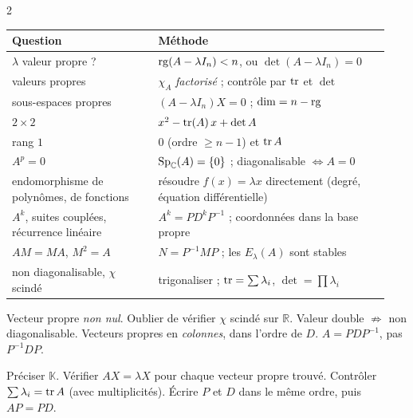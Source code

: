 \documentclass[a4paper,10pt]{article}
\newcommand{\K}{\mathbb{K}}\newcommand{\R}{\mathbb{R}}\newcommand{\C}{\mathbb{C}}\newcommand{\Z}{\mathbb{Z}}
\newcommand{\sous}[1]{\par\needspace{6\baselineskip}\vspace{0.25em}\noindent{\sffamily\bfseries\small\color{BleuMoyen}#1}\par\nobreak}
\begin{document}
\begin{multicols}{2}
\sous{Je vois\dots\ je fais\dots}
{\small\renewcommand{\arraystretch}{1.16}
\begin{tabular}{@{}>{\raggedright\arraybackslash}p{0.36\linewidth}>{\raggedright\arraybackslash}p{0.58\linewidth}@{}}
\toprule
\textsf{\scriptsize Question} & \textsf{\scriptsize Méthode}\\\midrule
$\lambda$ valeur propre ? & $\operatorname{rg}(A-\lambda I_n)<n$, ou $\det(A-\lambda I_n)=0$\\
valeurs propres & $\chi_A$ \emph{factorisé} ; contrôle par $\operatorname{tr}$ et $\det$\\
sous-espaces propres & $(A-\lambda I_n)X=0$ ; $\dim=n-\operatorname{rg}$\\
$2\times2$ & $x^2-\operatorname{tr}(A)\,x+\det A$\\
rang $1$ & $0$ (ordre $\geq n-1$) et $\operatorname{tr} A$\\
$A^p=0$ & $\Sp_\C(A)=\{0\}$ ; diagonalisable $\iff A=0$\\
endomorphisme de polynômes, de fonctions & résoudre $f(x)=\lambda x$ directement (degré, équation différentielle)\\
$A^k$, suites couplées, récurrence linéaire & $A^k=PD^kP^{-1}$ ; coordonnées dans la base propre\\
$AM=MA$, $M^2=A$ & $N=P^{-1}MP$ ; les $E_\lambda(A)$ sont stables\\
non diagonalisable, $\chi$ scindé & trigonaliser ; $\operatorname{tr}=\sum\lambda_i$, $\det=\prod\lambda_i$\\
\bottomrule
\end{tabular}}

\begin{PIEGE}
Vecteur propre \emph{non nul}. Oublier de vérifier $\chi$ scindé sur $\R$. Valeur double $\not\Rightarrow$ non diagonalisable.
Vecteurs propres en \emph{colonnes}, dans l'ordre de $D$. $A=PDP^{-1}$, pas $P^{-1}DP$.
\end{PIEGE}

\begin{REFL}
Préciser $\K$. Vérifier $AX=\lambda X$ pour chaque vecteur propre trouvé. Contrôler $\sum\lambda_i=\operatorname{tr} A$ (avec multiplicités).
Écrire $P$ et $D$ dans le même ordre, puis $AP=PD$.
\end{REFL}

\end{multicols}
\end{document}
